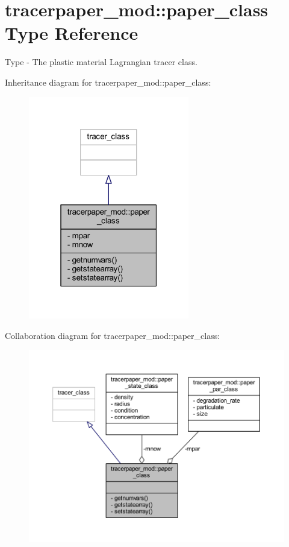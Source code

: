 \hypertarget{structtracerpaper__mod_1_1paper__class}{}\section{tracerpaper\+\_\+mod\+:\+:paper\+\_\+class Type Reference}
\label{structtracerpaper__mod_1_1paper__class}


Type -\/ The plastic material Lagrangian tracer class.  




Inheritance diagram for tracerpaper\+\_\+mod\+:\+:paper\+\_\+class\+:\nopagebreak
\begin{figure}[H]
\begin{center}
\leavevmode
\includegraphics[width=199pt]{structtracerpaper__mod_1_1paper__class__inherit__graph}
\end{center}
\end{figure}


Collaboration diagram for tracerpaper\+\_\+mod\+:\+:paper\+\_\+class\+:\nopagebreak
\begin{figure}[H]
\begin{center}
\leavevmode
\includegraphics[width=350pt]{structtracerpaper__mod_1_1paper__class__coll__graph}
\end{center}
\end{figure}
